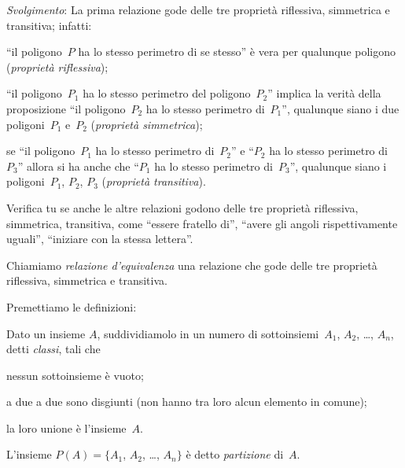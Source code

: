 \begin{exrig}
\begin{esempio}
\emph{Svolgimento}: La prima relazione gode delle tre proprietà riflessiva, simmetrica e transitiva; infatti:

\begin{itemize*}
\item ``il poligono~$P$ ha lo stesso perimetro di se stesso'' è vera per qualunque poligono (\emph{proprietà riflessiva});
\item ``il poligono~$P_1$ ha lo stesso perimetro del poligono~$P_2$'' implica la verità della proposizione ``il
poligono~$P_2$ ha lo stesso perimetro di~$P_1$'', qualunque siano i due poligoni~$P_1$ e~$P_2$ (\emph{proprietà
simmetrica});
\item se ``il poligono~$P_1$ ha lo stesso perimetro di~$P_2$'' e ``$P_2$ ha lo stesso perimetro di~$P_3$'' allora si ha anche che ``$P_1$ ha lo stesso
perimetro di~$P_3$'', qualunque siano i poligoni~$P_1$, $P_2$, $P_3$ (\emph{proprietà transitiva}).
\end{itemize*}

Verifica tu se anche le altre relazioni godono delle tre proprietà riflessiva, simmetrica, transitiva, come
``essere fratello di'', ``avere gli angoli rispettivamente uguali'', ``iniziare con la stessa lettera''.
 \end{esempio}
\end{exrig}

\begin{definizione}
Chiamiamo \emph{relazione d'equivalenza} una relazione che gode delle tre proprietà riflessiva, simmetrica e transitiva.
\end{definizione}

\ovalbox{\risolvi \ref{ese:\thechapter.26}}

\pagebreak

Premettiamo le definizioni:

\begin{definizione}
Dato un insieme $A$, suddividiamolo in un numero di sottoinsiemi~$A_1$, $A_2$, \ldots, $A_n$, detti \emph{classi}, tali che
\begin{enumeratea}
\item nessun sottoinsieme è vuoto;
\item a due a due sono disgiunti (non hanno tra loro alcun elemento in comune);
\item la loro unione è l'insieme~$A$.
\end{enumeratea}
L'insieme $P(A) = \{A_1$, $A_2$, \ldots, $A_n\}$ è detto \emph{partizione} di~$A$.
\end{definizione}

